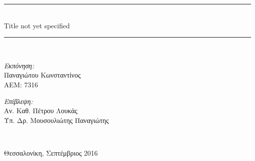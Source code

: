 \begin{titlepage}
\begin{center}
    \rule{450pt}{4pt} \\[0.4cm]
    {\fontsize{20.26pt}{1em}\selectfont Title not yet specified}

    \rule{350pt}{4pt} \\[4cm]

    \begin{minipage}{0.4\textwidth}
      \begin{flushleft} \large
        \emph{Εκπόνηση:} \\
        Παναγιώτου Κωνσταντίνος \\
        ΑΕΜ: 7316
      \end{flushleft}
    \end{minipage}
    \begin{minipage}{0.4\textwidth}
      \begin{flushright} \large
        \emph{Επίβλεψη:} \\
        Αν. Καθ. Πέτρου Λουκάς\\
        Υπ. Δρ. Μουσουλιώτης Παναγιώτης \\
      \end{flushright}
    \end{minipage}
    \\[1cm]
    \vfill

    \large Θεσσαλονίκη, Σεπτέμβριος 2016

  \end{center}
\end{titlepage}
